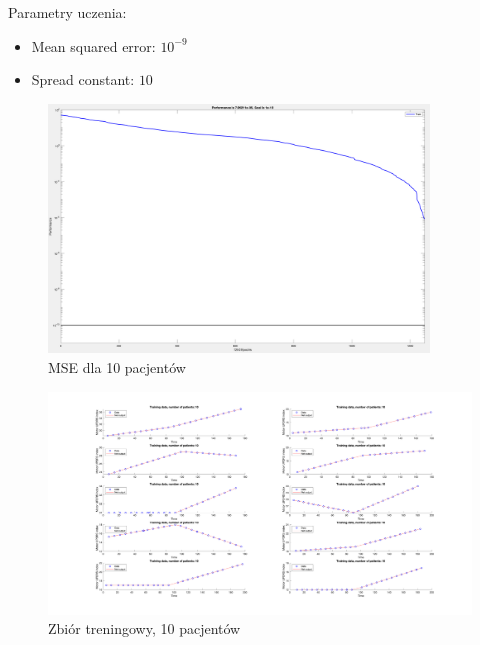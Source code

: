 \documentclass[12pt]{article}
\begin{document}
Parametry uczenia:
\begin{itemize}
\item Mean squared error: $10^{-9}$
\item Spread constant: $10$
\end{itemize}

\begin{figure}[h!]

\centering
\includegraphics[width=0.9\textwidth]{mse-normal-10.png}
\caption{MSE dla 10 pacjentów}

\end{figure}

\begin{figure}[h!]

\centering
\includegraphics[width=1.1\textwidth]{training-normal-10.png}
\caption{Zbiór treningowy, 10 pacjentów}

\end{figure}
\end{document}
